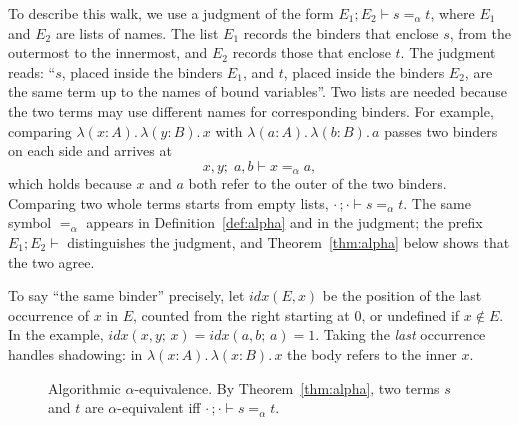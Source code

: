 \documentclass[acmsmall,screen,nonacm]{acmart}
\newcommand{\Sort}[1]{\mathsf{Sort}\;#1}
\newcommand{\tPi}[3]{\Pi(#1{:}#2).\,#3}
\newcommand{\tLam}[3]{\lambda(#1{:}#2).\,#3}
\newcommand{\alphaeq}{=_{\alpha}}
\newcommand{\rulename}[1]{\;(\textsc{#1})}
\begin{document}
To describe this walk, we use a judgment of the form $E_1; E_2 \vdash s \alphaeq t$, where $E_1$ and $E_2$ are lists of names.
The list $E_1$ records the binders that enclose $s$, from the outermost to the innermost, and $E_2$ records those that enclose $t$.
The judgment reads: ``$s$, placed inside the binders $E_1$, and $t$, placed inside the binders $E_2$, are the same term up to the names
of bound variables''. Two lists are needed because the two terms may use different names for corresponding binders.
For example, comparing $\tLam{x}{A}{\tLam{y}{B}{x}}$ with $\tLam{a}{A}{\tLam{b}{B}{a}}$ passes two binders on each side and arrives at
\[
x, y;\; a, b \vdash x \alphaeq a,
\]
which holds because $x$ and $a$ both refer to the outer of the two binders. Comparing two whole terms starts from empty lists,
$\cdot\,;\cdot \vdash s \alphaeq t$. The same symbol $\alphaeq$ appears in Definition~\ref{def:alpha} and in the judgment;
the prefix $E_1; E_2 \vdash$ distinguishes the judgment, and Theorem~\ref{thm:alpha} below shows that the two agree.

To say ``the same binder'' precisely, let $\mathit{idx}(E, x)$ be the position of the last occurrence of $x$ in $E$, counted from
the right starting at $0$, or undefined if $x \notin E$. In the example, $\mathit{idx}(x, y;\, x) = \mathit{idx}(a, b;\, a) = 1$.
Taking the \emph{last} occurrence handles shadowing: in $\tLam{x}{A}{\tLam{x}{B}{x}}$ the body refers to the inner $x$.

\begin{figure}[ht]
\footnotesize
\centering
{}
\caption{Algorithmic $\alpha$-equivalence. By Theorem~\ref{thm:alpha}, two terms $s$ and $t$ are $\alpha$-equivalent iff $\cdot\,;\cdot \vdash s \alphaeq t$.}
\label{fig:alpha}
\end{figure}
\end{document}
